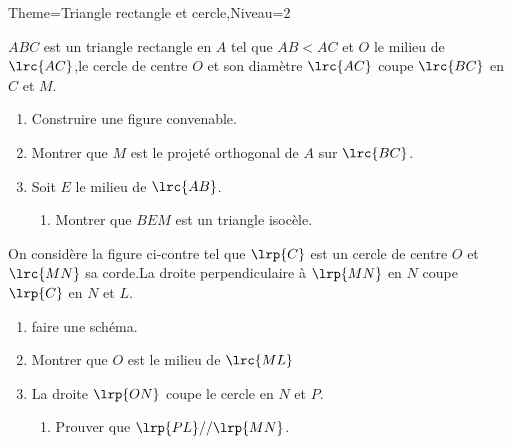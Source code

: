 \documentclass[a4paper,12pt]{article}
\begin{document}
\begin{Maquette}[Fiche]{Theme=Triangle rectangle et cercle,Niveau=2}

\begin{exercice}%
$ABC$ est un triangle rectangle en $A$ tel que $AB<AC$ et $O$ le milieu de $\lrc{AC}$,le cercle de centre $O$ et son diamètre $\lrc{AC}$ coupe $\lrc{BC}$ en $C$ et $M$.
\begin{enumerate}
\item Construire une figure convenable.
\item Montrer que $M$ est le projeté orthogonal de $A$ sur $\lrc{BC}$.
\item Soit $E$ le milieu de $\lrc{AB}$.
\begin{enumerate}
\item Montrer que $BEM$ est un triangle isocèle.
\end{enumerate}
\end{enumerate}
\end{exercice}

\begin{exercice}
On considère la figure ci-contre tel que $\lrp{C}$ est un cercle de centre $O$ et $\lrc{MN}$ sa corde.La droite perpendiculaire à $\lrp{MN}$ en $N$ coupe $\lrp{C}$ en $N$ et $L$.
\begin{minipage}{0.5\linewidth}
\begin{enumerate}
\item faire une schéma.
\item Montrer que $O$ est le milieu de $\lrc{ML}$
\item La droite $\lrp{ON}$ coupe le cercle en $N$ et $P$.
\begin{enumerate}
\item Prouver que $\lrp{PL}//\lrp{MN}$.
\end{enumerate}
\end{enumerate}
\end{minipage}%
\begin{minipage}{0.5\linewidth}
\end{minipage}
\end{exercice}


\end{Maquette}
\end{document}
